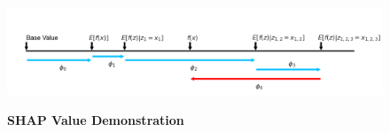 \begin{figure}[H]
  \centering
  \caption{\textbf{SHAP Value Demonstration}}
  \includegraphics[width=.9\textwidth]{images/shap_force_dem.png}
  \label{fig: shap_demo}
\end{figure}

